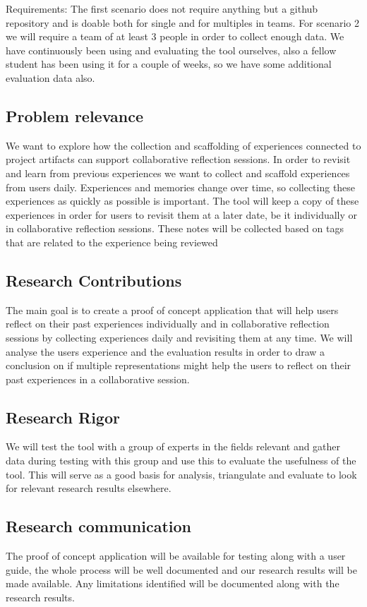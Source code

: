 Requirements: 
The first scenario does not require anything but a github repository and is doable both for single and for multiples in teams.
For scenario 2 we will require a team of at least 3 people in order to collect enough data. 
We have continuously been using and evaluating the tool ourselves, also a fellow student has been using it for a couple of weeks, so we have some additional evaluation
data also.


\subsection{Problem relevance}
We want to explore how the collection and scaffolding of experiences connected to project artifacts can support collaborative reflection sessions. In order to revisit and learn from previous experiences we want to collect and scaffold experiences from users daily. Experiences and memories change over time, so collecting these experiences as quickly as possible is important. The tool will keep a copy of these experiences in order for users to revisit them at a later date, be it individually or in collaborative reflection sessions. These notes will be collected based on tags that are related to the experience being reviewed \cite{Hassan-montero2006}

\subsection{Research Contributions}
The main goal is to create a proof of concept application that will help users reflect on their past experiences individually and in collaborative reflection sessions by collecting experiences daily and revisiting them at any time. We will analyse the users experience and the evaluation results  in order to draw a conclusion on if multiple representations might help the users to reflect on their past experiences in a collaborative session.

\subsection{Research Rigor}
We will test the tool with a group of experts in the fields relevant and gather data during testing with this group and use this to evaluate the usefulness of the tool. This will serve as a good basis for analysis, triangulate and evaluate to look for relevant research results elsewhere.

\subsection{Research communication}
The proof of concept application will be available for testing along with a user guide, the whole process will be well documented and our research results will be made available.
Any limitations identified  will be documented along with the research results. 



